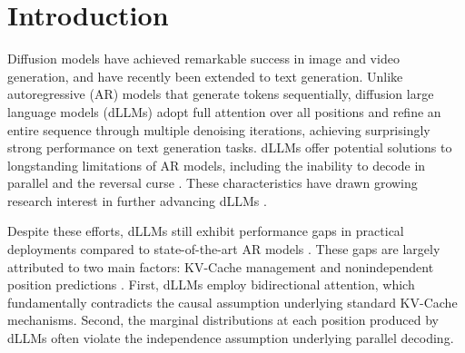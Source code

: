 \section{Introduction}
Diffusion models have achieved remarkable success in image \cite{sdxl, sana} and video \cite{stablevideo, hunyuanvideo} generation, and have recently been extended to text generation. Unlike autoregressive (AR) models \cite{gpt4, qwen2.5} that generate tokens sequentially, diffusion large language models (dLLMs) \cite{llada, dream} adopt full attention over all positions and refine an entire sequence through multiple denoising iterations, achieving surprisingly strong performance on text generation tasks. dLLMs offer potential solutions to longstanding limitations of AR models, including the inability to decode in parallel and the reversal curse \cite{reversal}. These characteristics have drawn growing research interest in further advancing dLLMs \cite{gemini_diffusion, seeddiffusion, mercury, llada2.0}. 

Despite these efforts, dLLMs still exhibit performance gaps in practical deployments compared to state-of-the-art AR models \cite{fastdllm, eagle3}. These gaps are largely attributed to two main factors: KV-Cache management \cite{fastdllm, dkvcache, dllmcache} and nonindependent position predictions \cite{parallelcurse, fastdllm}. First, dLLMs employ bidirectional attention, which fundamentally contradicts the causal assumption underlying standard KV-Cache mechanisms. Second, the marginal distributions at each position produced by dLLMs often violate the independence assumption underlying parallel decoding.

